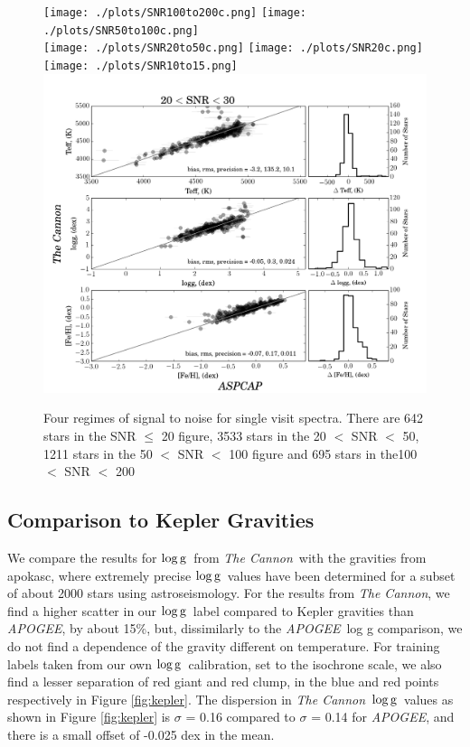 \documentclass[12pt, preprint]{aastex}
\newcommand{\logg}{\mbox{$\rm \log g$}}
\newcommand{\tc}{\textsl{The Cannon}}
\newcommand{\apogee}{\textsl{APOGEE}}
\begin{document}
 \begin{figure}[h!]
 \texttt{[image: ./plots/SNR100to200c.png]}
\texttt{[image: ./plots/SNR50to100c.png]}\\
\texttt{[image: ./plots/SNR20to50c.png]}
\texttt{[image: ./plots/SNR20c.png]}\\
\texttt{[image: ./plots/SNR10to15.png]}
\includegraphics[scale=0.24]{./plots/SNR20to30.png}
  \caption{Four regimes of signal to noise for single visit spectra. There are 642 stars in the SNR $\le$ 20 figure, 3533 stars in the 20 $<$ SNR $<$ 50, 1211 stars in the 50 $<$ SNR $<$ 100 figure and 695 stars in the100 $<$  SNR $<$ 200}
\label{fig:SNR}
\end{figure}


\subsection{Comparison to Kepler Gravities}

We compare the results for \logg\ from \tc\ with the gravities from apokasc, where extremely precise \logg\ values have been determined for a subset of about 2000 stars using astroseismology. For the results from \tc, we find a higher scatter in our \logg\ label compared to Kepler gravities than \textit{APOGEE}, by about 15\%, but, dissimilarly to the \apogee\ log g comparison, we do not find a dependence of the gravity different on temperature. For training labels taken from our own \logg\ calibration, set to the isochrone scale, we also find a lesser separation of red giant and red clump, in the blue and red points respectively in Figure \ref{fig:kepler}. The dispersion in \tc\ \logg\ values as shown in Figure \ref{fig:kepler} is $\sigma$ = 0.16 compared to $\sigma$ =  0.14 for \textit{APOGEE}, and there is a small offset of -0.025 dex in the mean. 
\end{document}
